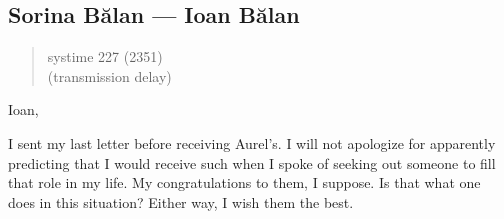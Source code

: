 \hypertarget{sorina-bux103lan-ioan-bux103lan}{%
\subsection{Sorina Bălan — Ioan Bălan}\label{sorina-bux103lan-ioan-bux103lan}}

\begin{quote}
systime 227 (2351)\\
(transmission delay)
\end{quote}

Ioan,

I sent my last letter before receiving Aurel's. I will not apologize for apparently predicting that I would receive such when I spoke of seeking out someone to fill that role in my life. My congratulations to them, I suppose. Is that what one does in this situation? Either way, I wish them the best.
